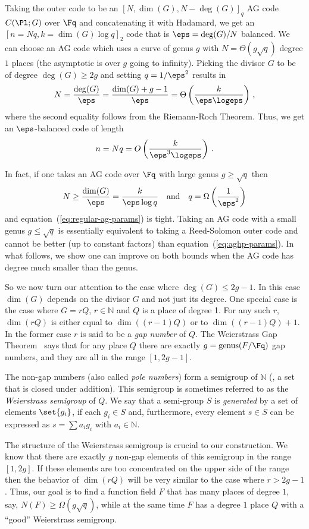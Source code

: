 Taking the outer code to be an $[N,\dim(G),N-\deg(G)]_q$ AG code
$C(\Pl;G)$ over $\Fq $ and concatenating it with Hadamard, we get an
$[n=Nq,k=\dim(G) \log q]_2$ code that is $\eps={\deg(G)}/{N}$
balanced. We can choose an AG code which uses a curve of genus $g$
with $N = \Theta(g \sqrt{q})$ degree $1$ places (the asymptotic is
over $g$ going to infinity). Picking the divisor $G$ to be of degree
$\deg(G) \ge 2g$ and setting $q= {1}/{\eps^2}$ results in
%
%
$$ N = \frac{\deg(G)}{\eps} = \frac{\dim(G)+g-1}{\eps}
= \Theta\left( \frac{k}{\eps \logeps}\right)\,,$$ where the second equality
follows from the Riemann-Roch Theorem. Thus, we get an
$\eps$-balanced code of length
\begin{equation}\label{eq:regular-ag-params}
    n = Nq = O\left(\frac{k}{\eps^3 \logeps}\right)\,.
\end{equation}

In fact, if one takes an AG code over $\Fq$ with large genus $g \ge
\sqrt{q}$ then $$N \ge \frac{\dim(G)}{\eps} = \frac{k}{\eps \log
q}\quad\text{and}\quad q=\Omega\left(\frac{1}{\eps^2}\right)$$ and
equation~(\ref{eq:regular-ag-params}) is tight. Taking an AG code
with a small genus $g \le \sqrt{q}$ is essentially equivalent to
taking a Reed-Solomon outer code and cannot be better (up to
constant factors) than equation~(\ref{eq:aghp-params}). In what
follows, we show one can improve on both bounds when the AG code has
degree much smaller than the genus.


So we now turn our attention to the case where $\deg(G) \le 2g-1$.
In this case $\dim(G)$ depends on the divisor $G$ and not just its
degree. One special case is the case where $G = rQ$, $r \in
\mathbb{N}$ and $Q$ is a place of degree 1. For any such $r$,
$\dim(rQ)$ is either equal to $\dim((r-1)Q)$ or to $\dim((r-1)Q)+1$.
In the former case $r$ is said to be a \emph{gap number} of $Q$. The
Weierstrass Gap Theorem~\cite[Thm I.6.7]{S:93} says that for any
place $Q$ there are exactly $g={\rm genus}(F/\Fq )$ gap numbers, and
they are all in the range $[1,2g-1]$.

The non-gap numbers (also called \emph{pole numbers}) form a
semigroup of $\mathbb{N}$ (\ie, a set that is closed under
addition). This semigroup is sometimes referred to as the
\emph{Weierstrass semigroup} of $Q$. We say that a semi-group $S$ is
\emph{generated} by a set of elements $\set{g_i}$, if each $g_i \in S$ and,
furthermore, every element $s \in S$ can be expressed as $s=\sum a_i
g_i$ with $a_i \in \mathbb{N}$.

The structure of the Weierstrass semigroup is crucial to our
construction. We know that there are exactly $g$ non-gap elements of
this semigroup in the range $[1,2g]$. If these elements are too
concentrated on the upper side of the range then the behavior of
$\dim(rQ)$ will be very similar to the case where $r > 2g-1$. Thus,
our goal is to find a function field $F$ that has many places of
degree $1$, say, $N(F) \ge \Omega(g \sqrt{q})$, while at the same
time $F$ has a degree $1$ place $Q$ with a ``good'' Weierstrass
semigroup.

